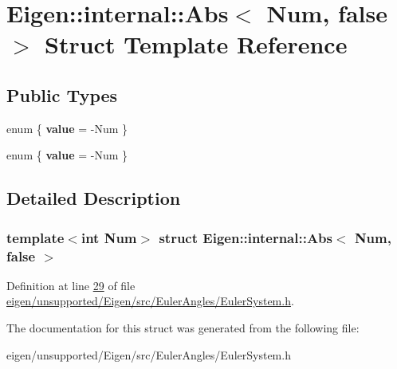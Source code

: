\hypertarget{struct_eigen_1_1internal_1_1_abs_3_01_num_00_01false_01_4}{}\section{Eigen\+:\+:internal\+:\+:Abs$<$ Num, false $>$ Struct Template Reference}
\label{struct_eigen_1_1internal_1_1_abs_3_01_num_00_01false_01_4}
\subsection*{Public Types}
\begin{DoxyCompactItemize}
\item 
\mbox{\label{struct_eigen_1_1internal_1_1_abs_3_01_num_00_01false_01_4_a650c1bc537ea0b6b5bddbbb72bbd3933}} 
enum \{ {\bfseries value} = -\/\+Num
 \}
\item 
\mbox{\label{struct_eigen_1_1internal_1_1_abs_3_01_num_00_01false_01_4_a6aadb97a6d146303690de72cd24c9b49}} 
enum \{ {\bfseries value} = -\/\+Num
 \}
\end{DoxyCompactItemize}


\subsection{Detailed Description}
\subsubsection*{template$<$int Num$>$\newline
struct Eigen\+::internal\+::\+Abs$<$ Num, false $>$}



Definition at line \hyperlink{eigen_2unsupported_2_eigen_2src_2_euler_angles_2_euler_system_8h_source_l00029}{29} of file \hyperlink{eigen_2unsupported_2_eigen_2src_2_euler_angles_2_euler_system_8h_source}{eigen/unsupported/\+Eigen/src/\+Euler\+Angles/\+Euler\+System.\+h}.



The documentation for this struct was generated from the following file\+:\begin{DoxyCompactItemize}
\item 
eigen/unsupported/\+Eigen/src/\+Euler\+Angles/\+Euler\+System.\+h\end{DoxyCompactItemize}
